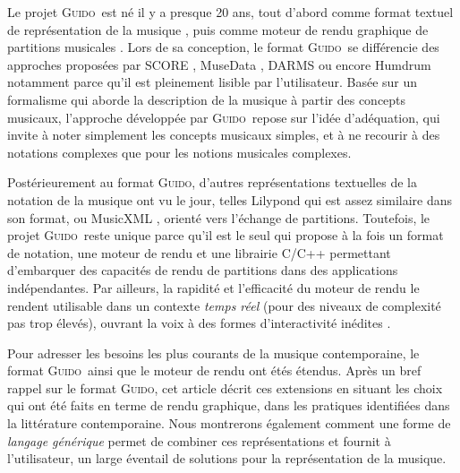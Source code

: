 \documentclass{article}
\newcommand{\guido}			{\textsc{Guido}}
\begin{document}
Le projet \guido\ est né il y a presque 20 ans, tout d'abord comme format textuel de représentation de la musique \cite{hoos98,guido}, puis comme moteur de rendu graphique de partitions musicales \cite{RENZ02}. 
Lors de sa conception, le format \guido\ se différencie des approches proposées par SCORE \cite{SCORE}, MuseData \cite{Hewlett97}, DARMS \cite{darms} ou encore Humdrum \cite{Huron97} notamment parce qu'il est pleinement lisible par l'utilisateur. Basée sur un formalisme qui aborde la description de la musique à partir des concepts musicaux, l'approche développée par \guido\ repose sur l'idée d'adéquation, qui invite à noter simplement les concepts musicaux simples, et à ne recourir à des notations complexes que pour les notions musicales complexes.

Postérieurement au format \guido, d'autres représentations textuelles de la notation de la musique ont vu le jour, telles Lilypond \cite{lilypond03,lilypond06} qui est assez similaire dans son format, ou MusicXML \cite{good01}, orienté vers l'échange de partitions. Toutefois, le projet \guido\ reste unique parce qu'il est le seul qui propose à la fois un format de notation, une moteur de rendu et une librairie C/C++ permettant d'embarquer des capacités de rendu de partitions dans des applications indépendantes.
Par ailleurs, la rapidité et l'efficacité du moteur de rendu le rendent utilisable dans un contexte \textit{temps réel} (pour des niveaux de complexité pas trop élevés), ouvrant la voix à des formes d'interactivité inédites \cite{Hoadley12,Fober:12a}.

Pour adresser les besoins les plus courants de la musique contemporaine, le format \guido\ ainsi que le moteur de rendu ont étés étendus. Après un bref rappel sur le format \guido, cet article décrit ces extensions en  situant les choix qui ont été faits en terme de rendu graphique, dans les pratiques identifiées dans la littérature contemporaine. Nous montrerons également comment une forme de \emph{langage générique} permet de combiner ces représentations et fournit à l'utilisateur, un large éventail de solutions pour la représentation de la musique.


\end{document}

